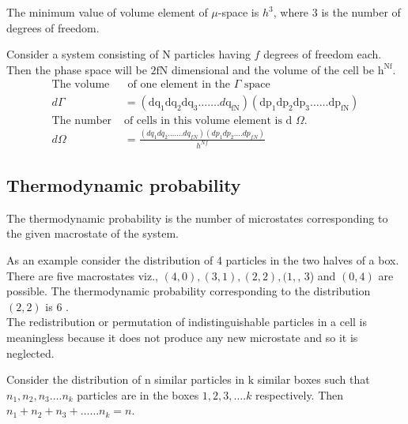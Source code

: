  The minimum value of volume element of $\mu$-space is $h^{3}$, where 3 is the number of degrees of freedom.\\
 \par Consider a system consisting of $\mathrm{N}$ particles having $f$ degrees of freedom each. Then the phase space will be $2 \mathrm{fN}$ dimensional and the volume of the cell be $\mathrm{h}^{\mathrm{Nf}}$.
 \begin{align*}
  \text{The volume}&\text{ of one element in the $\Gamma$ space}\\
  d\Gamma&=\left(\mathrm{dq}_{1} \mathrm{dq}_{2} \mathrm{dq}_{3} \ldots \ldots . d \mathrm{q}_{\mathrm{fN}}\right)\left(\mathrm{dp}_{1} \mathrm{dp}_{2} \mathrm{dp}_{3} \ldots \ldots \mathrm{dp}_{\mathrm{fN}}\right)\\
  \text{The number }&\text{of cells in this volume element is d $\Omega$.}
 \\
 d \Omega&=\frac{\left(d q_{1} d q_{2} \ldots \ldots . d q_{f N}\right)\left(d p_{1} d p_{2} \ldots . d p_{f N}\right)}{h^{N f}}
 \end{align*}
\subsection{ Thermodynamic probability}
 The thermodynamic probability is the number of microstates corresponding to the given macrostate of the system.
 
 As an example consider the distribution of 4 particles in the two halves of a box. There are five macrostates viz., $(4,0),(3,1),(2,2),(1,$, 3) and $(0,4)$ are possible. The thermodynamic probability corresponding to the distribution $(2,2)$ is 6 .\\
 The redistribution or permutation of indistinguishable particles in a cell is meaningless because it does not produce any new microstate and so it is neglected.
 
 Consider the distribution of $\mathrm{n}$ similar particles in $\mathrm{k}$ similar boxes such that $n_{1}, n_{2}, n_{3} \ldots . n_{k}$ particles are in the boxes $1,2,3, \ldots . k$ respectively. Then $n_{1}+n_{2}+n_{3}+\ldots \ldots n_{k}=n$.
 
